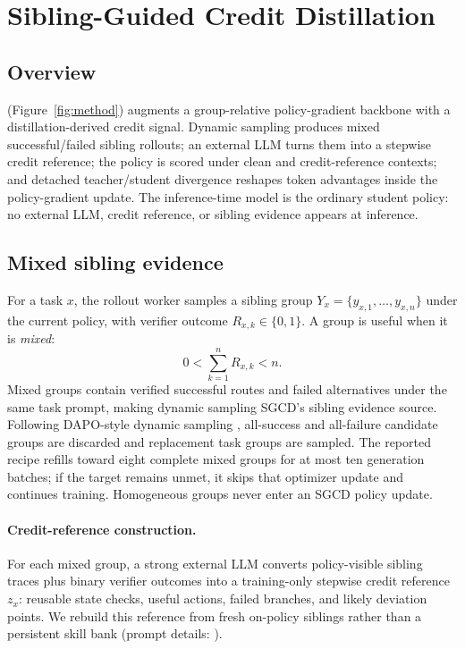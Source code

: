 \section{Sibling-Guided Credit Distillation}
\label{sec:method}

\subsection{Overview}
\method (Figure~\ref{fig:method}) augments a group-relative policy-gradient
backbone with a distillation-derived credit signal. Dynamic sampling produces
mixed successful/failed sibling rollouts; an external LLM turns them into a
stepwise credit reference; the policy is scored under clean and credit-reference
contexts; and detached teacher/student divergence reshapes token advantages
inside the policy-gradient update. The inference-time model is the ordinary student policy: no external LLM,
credit reference, or sibling evidence appears at inference.

\subsection{Mixed sibling evidence}
\label{sec:siblings}
For a task $x$, the rollout worker samples a sibling group
$Y_x=\{y_{x,1},\ldots,y_{x,n}\}$ under the current policy, with verifier outcome
$R_{x,k}\in\{0,1\}$. A group is useful when it is \emph{mixed}:
\begin{equation}
  0 < \sum_{k=1}^{n} R_{x,k} < n .
\end{equation}
Mixed groups contain verified successful routes and failed alternatives under
the same task prompt, making dynamic sampling SGCD's sibling evidence source.
Following DAPO-style dynamic sampling \citep{dapo2025}, all-success and
all-failure candidate groups are discarded and replacement task groups are
sampled. The reported recipe refills toward eight complete mixed groups for at
most ten generation batches; if the target remains unmet, it skips that
optimizer update and continues training. Homogeneous groups never enter an SGCD
policy update.

\paragraph{Credit-reference construction.} For each mixed group, a strong
external LLM converts policy-visible sibling traces plus binary verifier
outcomes into a training-only stepwise credit reference $z_x$: reusable state
checks, useful actions, failed
branches, and likely deviation points. We rebuild this reference from fresh
on-policy siblings rather than a persistent skill bank (prompt details:
).

